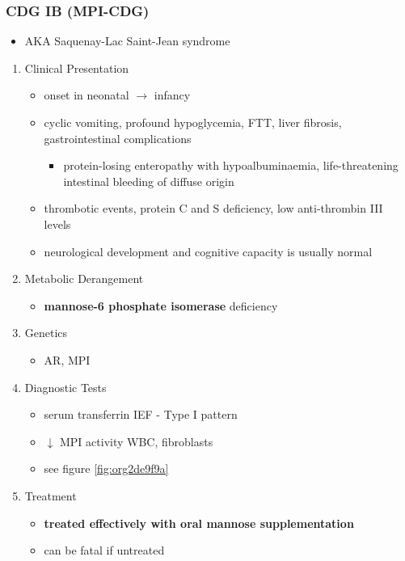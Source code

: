 \documentclass[12pt]{scrartcl}
\begin{document}
\subsubsection{CDG IB (MPI-CDG)}
\label{sec:org8f61085}
\begin{itemize}
\item AKA Saquenay-Lac Saint-Jean syndrome
\end{itemize}
\begin{enumerate}
\item Clinical Presentation
\label{sec:orgbeab613}
\begin{itemize}
\item onset in neonatal \(\to\) infancy
\item cyclic vomiting, profound hypoglycemia, FTT, liver
fibrosis, gastrointestinal complications
\begin{itemize}
\item protein-losing enteropathy with hypoalbuminaemia, life-threatening
intestinal bleeding of diffuse origin
\end{itemize}
\item thrombotic events, protein C and S deficiency, low anti-thrombin III levels
\item neurological development and cognitive capacity is usually normal
\end{itemize}

\item Metabolic Derangement
\label{sec:org278ba5e}
\begin{itemize}
\item \textbf{mannose-6 phosphate isomerase} deficiency
\end{itemize}


\item Genetics
\label{sec:orged985fc}
\begin{itemize}
\item AR, MPI
\end{itemize}

\item Diagnostic Tests
\label{sec:org45bba37}
\begin{itemize}
\item serum transferrin IEF - Type I pattern
\item \(\downarrow\) MPI activity WBC, fibroblasts
\item see figure \ref{fig:org2de9f9a}
\end{itemize}
\item Treatment
\label{sec:org44429e3}
\begin{itemize}
\item \textbf{treated effectively with oral mannose supplementation}
\item can be fatal if untreated
\end{itemize}
\end{enumerate}
\end{document}
